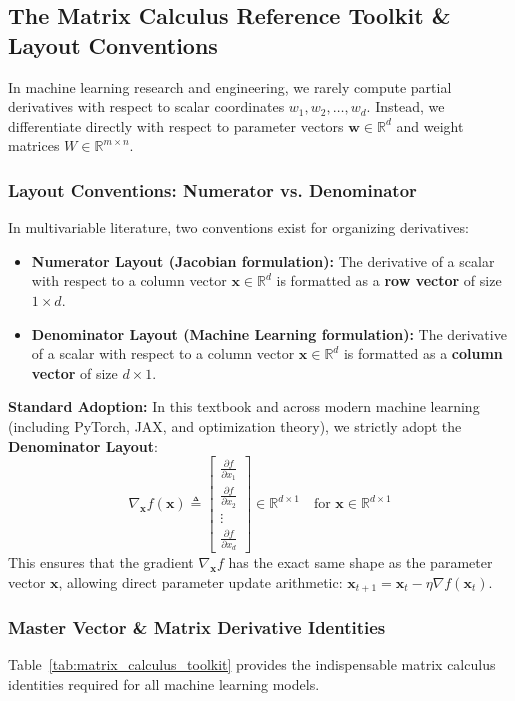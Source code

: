\subsection{The Matrix Calculus Reference Toolkit \& Layout Conventions}
In machine learning research and engineering, we rarely compute partial derivatives with respect to scalar coordinates $w_1, w_2, \dots, w_d$. Instead, we differentiate directly with respect to parameter vectors $\mathbf{w} \in \mathbb{R}^d$ and weight matrices $W \in \mathbb{R}^{m \times n}$.

\subsubsection{Layout Conventions: Numerator vs. Denominator}
In multivariable literature, two conventions exist for organizing derivatives:
\begin{itemize}
    \item \textbf{Numerator Layout (Jacobian formulation):} The derivative of a scalar with respect to a column vector $\mathbf{x} \in \mathbb{R}^d$ is formatted as a \textbf{row vector} of size $1 \times d$.
    \item \textbf{Denominator Layout (Machine Learning formulation):} The derivative of a scalar with respect to a column vector $\mathbf{x} \in \mathbb{R}^d$ is formatted as a \textbf{column vector} of size $d \times 1$.
\end{itemize}
\textbf{Standard Adoption:} In this textbook and across modern machine learning (including PyTorch, JAX, and optimization theory), we strictly adopt the \textbf{Denominator Layout}:
\begin{equation}
\nabla_{\mathbf{x}} f(\mathbf{x}) \triangleq \begin{bmatrix} \frac{\partial f}{\partial x_1} \\ \frac{\partial f}{\partial x_2} \\ \vdots \\ \frac{\partial f}{\partial x_d} \end{bmatrix} \in \mathbb{R}^{d \times 1} \quad \text{for } \mathbf{x} \in \mathbb{R}^{d \times 1}
\end{equation}
This ensures that the gradient $\nabla_{\mathbf{x}} f$ has the exact same shape as the parameter vector $\mathbf{x}$, allowing direct parameter update arithmetic: $\mathbf{x}_{t+1} = \mathbf{x}_t - \eta \nabla f(\mathbf{x}_t)$.

\subsubsection{Master Vector \& Matrix Derivative Identities}
Table~\ref{tab:matrix_calculus_toolkit} provides the indispensable matrix calculus identities required for all machine learning models.

